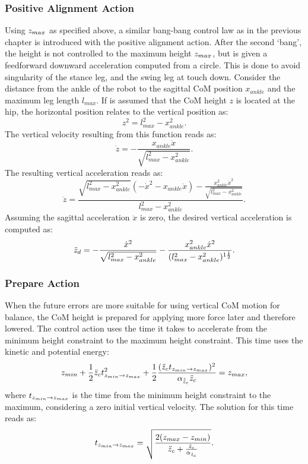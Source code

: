 \subsubsection{Positive Alignment Action} 
Using $z_{max}$ as specified above, a similar bang-bang control law as in the previous chapter is introduced with the positive alignment action. After the second `bang', the height is not controlled to the maximum height $z_{max}$, but is given a feedforward downward acceleration computed from a circle. This is done to avoid singularity of the stance leg, and the swing leg at touch down. Consider the distance from the ankle of the robot to the sagittal \ac{CoM} position $x_{ankle}$ and the maximum leg length $l_{max}$. If is assumed that the \ac{CoM} height $z$ is located at the hip, the horizontal position relates to the vertical position as:
\begin{equation}
z^2 = l_{max}^2-x_{ankle}^2.
\end{equation}
The vertical velocity resulting from this function reads as:
\begin{equation}
 \dot{z} = -\frac{x_{ankle}\dot{x}}{\sqrt{l_{max}^2-x_{ankle}^2}}.
\end{equation}
The resulting vertical acceleration reads as:
\begin{equation}
\ddot{z} = \frac{\sqrt{l_{max}^2-x_{ankle}^2}(-\dot{x}^2-x_{ankle}\ddot{x}) - \frac{x_{ankle}^2\dot{x}^2}{\sqrt{l_{max}^2-x_{ankle}^2}}}{ l_{max}^2-x_{ankle}^2}.
\end{equation}
Assuming the sagittal acceleration $\ddot{x}$ is zero, the desired vertical acceleration is computed as:
\begin{equation}
 \ddot{z}_d = -\frac{\dot{x}^2}{\sqrt{ l_{max}^2-x_{ankle}^2}} - \frac{x_{ankle}^2\dot{x}^2}{(l_{max}^2-x_{ankle}^2)^{1\frac{1}{2}}}.
\end{equation}
\subsubsection{Prepare Action} 
When the future errors are more suitable for using vertical \ac{CoM} motion for balance, the \ac{CoM} height is prepared for applying more force later and therefore lowered. The control action uses the time it takes to accelerate from the minimum height constraint to the maximum height constraint. This time uses the kinetic and potential energy:
\begin{equation}
	z_{min} + \frac{1}{2}\ddot{z}_{c} t_{z_{min} \rightarrow z_{max}}^2 + \frac{1}{2}\frac{(\ddot{z}_{c} t_{z_{min} \rightarrow z_{max}})^2}{\alpha_{\hat{\ddot{z}}_{c}} \ddot{z}_{c}} = z_{max},
\end{equation}
where $t_{z_{min} \rightarrow z_{max}}$ is the time from the minimum height constraint to the maximum, considering a zero initial vertical velocity.
The solution for this time reads as:
\begin{equation}
 t_{z_{min} \rightarrow z_{max}}= \sqrt{\frac{2(z_{max} - z_{min})}{\ddot{z}_{c} + \frac{\ddot{z}_{c}}{\alpha_{\hat{\ddot{z}}_{c}}} }}.
\end{equation}

